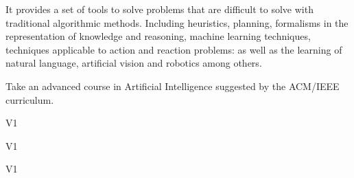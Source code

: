 \begin{syllabus}


\begin{justification}
  It provides a set of tools to solve problems that are difficult to solve with traditional algorithmic methods. Including heuristics, planning, formalisms in the representation of knowledge and reasoning, machine learning techniques, techniques applicable to action and reaction problems: as well as the learning of natural language, artificial vision and robotics among others. 
\end{justification}

\begin{goals}
\item Take an advanced course in Artificial Intelligence suggested by the ACM/IEEE curriculum.
\end{goals}

\begin{outcomes}{V1}
    \item {}
    \item {}
\end{outcomes}

\begin{specificoutcomes}{V1} 
    \item {}
    \item {}
    \item {}
    \item {}
    \item {}
    \item {}
\end{specificoutcomes}

\begin{competences}{V1}
\item {} 
\item {} 
\item {}
\end{competences}


\end{syllabus}
